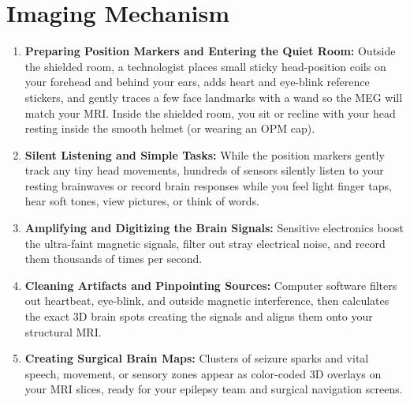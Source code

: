 \section{Imaging Mechanism}
\begin{enumerate}
  \item \textbf{Preparing Position Markers and Entering the Quiet Room:} Outside the shielded room, a technologist places small sticky head-position coils on your forehead and behind your ears, adds heart and eye-blink reference stickers, and gently traces a few face landmarks with a wand so the MEG will match your MRI. Inside the shielded room, you sit or recline with your head resting inside the smooth helmet (or wearing an OPM cap).
  \item \textbf{Silent Listening and Simple Tasks:} While the position markers gently track any tiny head movements, hundreds of sensors silently listen to your resting brainwaves or record brain responses while you feel light finger taps, hear soft tones, view pictures, or think of words.
  \item \textbf{Amplifying and Digitizing the Brain Signals:} Sensitive electronics boost the ultra-faint magnetic signals, filter out stray electrical noise, and record them thousands of times per second.
  \item \textbf{Cleaning Artifacts and Pinpointing Sources:} Computer software filters out heartbeat, eye-blink, and outside magnetic interference, then calculates the exact 3D brain spots creating the signals and aligns them onto your structural MRI.
  \item \textbf{Creating Surgical Brain Maps:} Clusters of seizure sparks and vital speech, movement, or sensory zones appear as color-coded 3D overlays on your MRI slices, ready for your epilepsy team and surgical navigation screens.
\end{enumerate}


